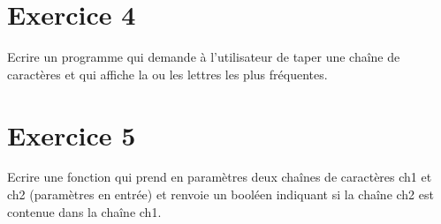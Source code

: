 \documentclass{article}
\begin{document}
	\section*{Exercice 4}
		Ecrire un programme qui demande à l'utilisateur de taper une chaîne de caractères et qui affiche la ou les lettres les plus fréquentes.	
	\section*{Exercice 5}		
		Ecrire une fonction qui prend en paramètres deux chaînes de caractères ch1 et ch2 (paramètres en entrée) et renvoie un booléen indiquant si la chaîne ch2 est contenue dans la chaîne ch1.
\end{document}
